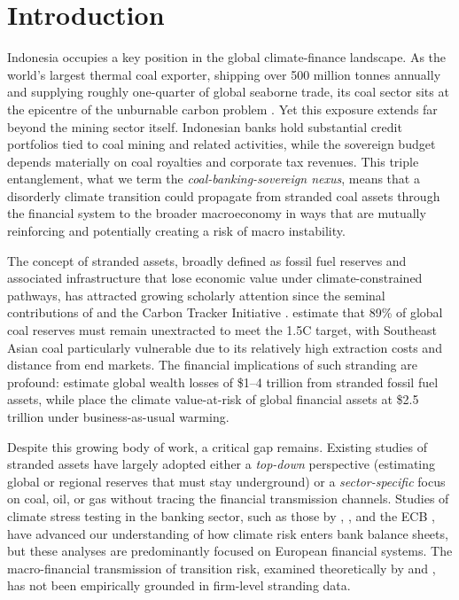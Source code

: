 
\section{Introduction}
\label{sec:introduction}

Indonesia occupies a key position in the global climate-finance landscape. As the world's largest thermal coal exporter, shipping over 500 million tonnes annually and supplying roughly one-quarter of global seaborne trade, its coal sector sits at the epicentre of the unburnable carbon problem \citep{McGlade2015, Welsby2021}. Yet this exposure extends far beyond the mining sector itself. Indonesian banks hold substantial credit portfolios tied to coal mining and related activities, while the sovereign budget depends materially on coal royalties and corporate tax revenues. This triple entanglement, what we term the \textit{coal-banking-sovereign nexus}, means that a disorderly climate transition could propagate from stranded coal assets through the financial system to the broader macroeconomy in ways that are mutually reinforcing and potentially creating a risk of macro instability.

The concept of stranded assets, broadly defined as fossil fuel reserves and associated infrastructure that lose economic value under climate-constrained pathways, has attracted growing scholarly attention since the seminal contributions of \citet{McGlade2015} and the Carbon Tracker Initiative \citep{CarbonTracker2012}. \citet{Welsby2021} estimate that 89\% of global coal reserves must remain unextracted to meet the 1.5\textdegree C target, with Southeast Asian coal particularly vulnerable due to its relatively high extraction costs and distance from end markets. The financial implications of such stranding are profound: \citet{Mercure2018} estimate global wealth losses of \$1--4 trillion from stranded fossil fuel assets, while \citet{Dietz2016} place the climate value-at-risk of global financial assets at \$2.5 trillion under business-as-usual warming.

Despite this growing body of work, a critical gap remains. Existing studies of stranded assets have largely adopted either a \textit{top-down} perspective (estimating global or regional reserves that must stay underground) or a \textit{sector-specific} focus on coal, oil, or gas without tracing the financial transmission channels. Studies of climate stress testing in the banking sector, such as those by \citet{Battiston2017}, \citet{Vermeulen2018}, and the ECB \citep{ECB2022}, have advanced our understanding of how climate risk enters bank balance sheets, but these analyses are predominantly focused on European financial systems. The macro-financial transmission of transition risk, examined theoretically by \citet{Carattini2023} and \citet{Monasterolo2020}, has not been empirically grounded in firm-level stranding data. 

